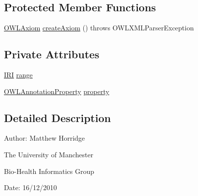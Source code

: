 \subsection*{Protected Member Functions}
\begin{DoxyCompactItemize}
\item 
\hyperlink{interfaceorg_1_1semanticweb_1_1owlapi_1_1model_1_1_o_w_l_axiom}{O\-W\-L\-Axiom} \hyperlink{classorg_1_1coode_1_1owlapi_1_1owlxmlparser_1_1_o_w_l_annotation_property_range_element_handler_a9b53941076b86b2faf5fa3a6d251d467}{create\-Axiom} ()  throws O\-W\-L\-X\-M\-L\-Parser\-Exception 
\end{DoxyCompactItemize}
\subsection*{Private Attributes}
\begin{DoxyCompactItemize}
\item 
\hyperlink{classorg_1_1semanticweb_1_1owlapi_1_1model_1_1_i_r_i}{I\-R\-I} \hyperlink{classorg_1_1coode_1_1owlapi_1_1owlxmlparser_1_1_o_w_l_annotation_property_range_element_handler_a68cacf34be8dfcf18e44a0a47ae68899}{range}
\item 
\hyperlink{interfaceorg_1_1semanticweb_1_1owlapi_1_1model_1_1_o_w_l_annotation_property}{O\-W\-L\-Annotation\-Property} \hyperlink{classorg_1_1coode_1_1owlapi_1_1owlxmlparser_1_1_o_w_l_annotation_property_range_element_handler_a49a2d40660f2820d5e69a115cd5767c5}{property}
\end{DoxyCompactItemize}


\subsection{Detailed Description}
Author\-: Matthew Horridge\par
 The University of Manchester\par
 Bio-\/\-Health Informatics Group\par
 Date\-: 16/12/2010 

